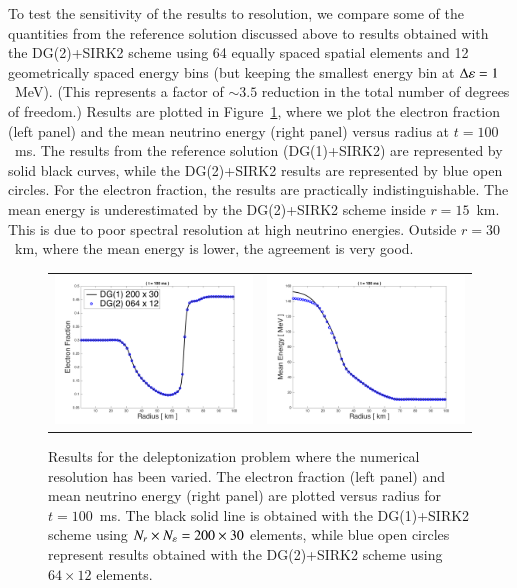 \documentclass[11pt,letterpaper,twoside,english,final]{article}
\begin{document}
To test the sensitivity of the results to resolution, we compare some of the quantities from the reference solution discussed above to results obtained with the DG(2)+SIRK2 scheme using 64 equally spaced spatial elements and 12 geometrically spaced energy bins (but keeping the smallest energy bin at $\Delta\varepsilon=1$~MeV).  
(This represents a factor of $\sim3.5$ reduction in the total number of degrees of freedom.)  
Results are plotted in Figure~\ref{fig:deleptonizationProblem_Resolution}, where we plot the electron fraction (left panel) and the mean neutrino energy (right panel) versus radius at $t=100$~ms.  
The results from the reference solution (DG(1)+SIRK2) are represented by solid black curves, while the DG(2)+SIRK2 results are represented by blue open circles.  
For the electron fraction, the results are practically indistinguishable.  
The mean energy is underestimated by the DG(2)+SIRK2 scheme inside $r=15$~km.  
This is due to poor spectral resolution at high neutrino energies.  
Outside $r=30$~km, where the mean energy is lower, the agreement is very good.  

\begin{figure}
  \centering
  \begin{tabular}{cc}
    \includegraphics[width=.475\textwidth]{./Figures/DeleptonizationProblem1D_ElectronFraction_Resolution.png} &
    \includegraphics[width=.475\textwidth]{./Figures/DeleptonizationProblem1D_MeanEnergy_Resolution.png}
  \end{tabular}
  \vspace{-0.1in}
  \flushleft\caption[Results for the deleptonization problem where the numerical resolution has been varied.]{Results for the deleptonization problem where the numerical resolution has been varied.  \textmd{The electron fraction (left panel) and mean neutrino energy (right panel) are plotted versus radius for $t=100$~ms.  The black solid line is obtained with the DG(1)+SIRK2 scheme using $N_{r}\times N_{\varepsilon}=200\times30$ elements, while blue open circles represent results obtained with the DG(2)+SIRK2 scheme using $64\times12$ elements.}}
  \label{fig:deleptonizationProblem_Resolution}
\end{figure}
\end{document}
